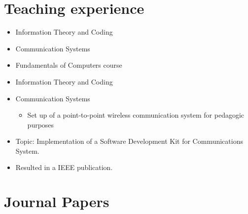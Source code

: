 \documentclass[11pt,a4paper,sans]{moderncv}        %
\begin{document}
\section{Teaching experience}
\begin{itemize}
\item Information Theory and Coding
\item Communication Systems
\item Fundamentals of Computers course
\end{itemize}
\vspace{10pt}

\begin{itemize}
\item Information Theory and Coding
\item Communication Systems
\begin{itemize}
\item Set up of a point-to-point wireless communication system for pedagogic purposes
\end{itemize}
\end{itemize}
\vspace{10pt}

\begin{itemize}
\item {Topic:} Implementation of a Software Development Kit for Communications System.
\item Resulted in a IEEE publication.
\end{itemize}
\vspace{10pt}



\section{Journal Papers}
\end{document}
